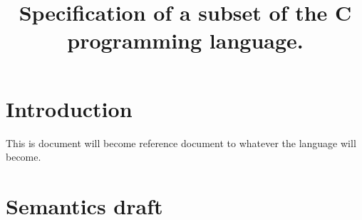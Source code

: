 \documentclass[12pt,english]{article}
\begin{document}
\title{Specification of a subset of the C programming language.}

\author{}


\maketitle
\begin{abstract}
  \singlespacing {}
\end{abstract}
\vfill
\pagebreak{}

\section{Introduction}

This is document will become reference document to whatever the language will become.

\section{Semantics draft}
\end{document}
